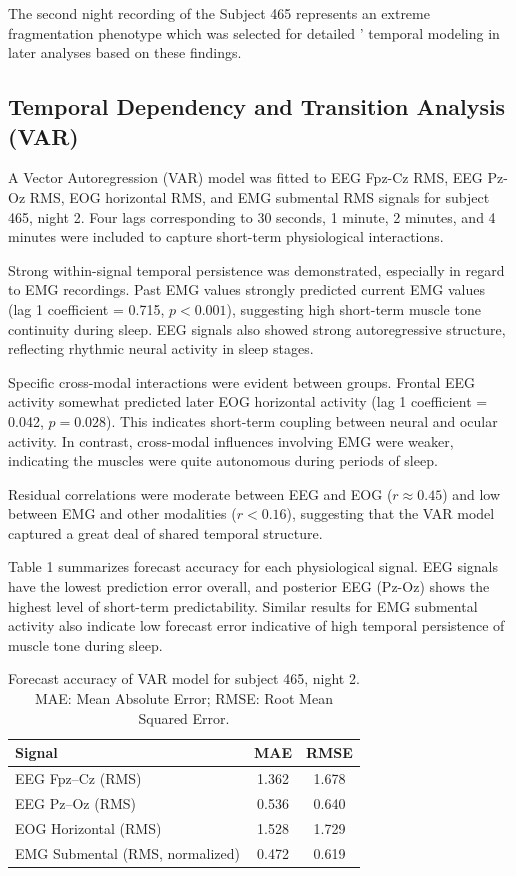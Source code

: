 \documentclass[10pt]{cai26}
\begin{document}
The second night recording of the Subject 465 represents an extreme fragmentation phenotype which was selected for detailed '
temporal modeling in later analyses based on these findings.

\subsection{Temporal Dependency and Transition Analysis (VAR)}

A Vector Autoregression (VAR) model was fitted to EEG Fpz-Cz RMS, EEG Pz-Oz RMS, EOG horizontal RMS, and EMG submental RMS signals 
for subject 465, night 2. Four lags corresponding to 30 seconds, 1 minute, 2 minutes, and 4 minutes were included to capture 
short-term physiological interactions. 

Strong within-signal temporal persistence was demonstrated, especially in regard to EMG recordings. Past EMG values strongly 
predicted current EMG values (lag 1 coefficient = 0.715, $p < 0.001$), suggesting high short-term muscle tone continuity during 
sleep. EEG signals also showed strong autoregressive structure, reflecting rhythmic neural activity in sleep stages. 

Specific cross-modal interactions were evident between groups. Frontal EEG activity somewhat predicted later EOG horizontal 
activity (lag 1 coefficient = 0.042, $p = 0.028$). This indicates short-term coupling between neural and ocular activity. In 
contrast, cross-modal influences involving EMG were weaker, indicating the muscles were quite autonomous during periods of 
sleep. 

Residual correlations were moderate between EEG and EOG ($r \approx 0.45$) and low between EMG and other modalities 
($r < 0.16$), suggesting that the VAR model captured a great deal of shared temporal structure. 

Table 1 summarizes forecast accuracy for each physiological signal. EEG signals have the lowest prediction error overall, and 
posterior EEG (Pz-Oz) shows the highest level of short-term predictability. Similar results for EMG submental activity also 
indicate low forecast error indicative of high temporal persistence of muscle tone during sleep.

\begin{table}[H]
\centering
\begin{tabular}{lcc}
\toprule
\textbf{Signal} & \textbf{MAE} & \textbf{RMSE} \\
\midrule
EEG Fpz--Cz (RMS) & 1.362 & 1.678 \\
EEG Pz--Oz (RMS) & 0.536 & 0.640 \\
EOG Horizontal (RMS) & 1.528 & 1.729 \\
EMG Submental (RMS, normalized) & 0.472 & 0.619 \\
\bottomrule
\end{tabular}
\caption{Forecast accuracy of VAR model for subject 465, night 2. MAE: Mean Absolute Error; RMSE: Root Mean Squared Error.}
\label{tab:var_accuracy}
\end{table}
\end{document}
